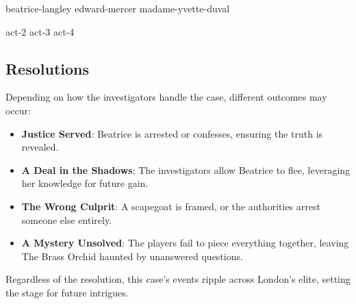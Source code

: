 \BeginBoxPage
	\begin{multicols}{2}
		{beatrice-langley}
		\vspace{2\baselineskip}
		{edward-mercer}
		\newcolumn
		{madame-yvette-duval}
	\end{multicols}
\EndBoxPage

{act-2}
{act-3}
{act-4}

\newcolumn
\subsection{Resolutions} 
Depending on how the investigators handle the case, different outcomes may occur:
\begin{itemize}
	\item \textbf{Justice Served}: Beatrice is arrested or confesses, ensuring the truth is revealed.
	\item \textbf{A Deal in the Shadows}: The investigators allow Beatrice to flee, leveraging her knowledge for future gain.
	\item \textbf{The Wrong Culprit}: A scapegoat is framed, or the authorities arrest someone else entirely.
	\item \textbf{A Mystery Unsolved}: The players fail to piece everything together, leaving The Brass Orchid haunted by unanswered questions.
\end{itemize}

Regardless of the resolution, this case's events ripple across London’s elite, setting the stage for future intrigues.
